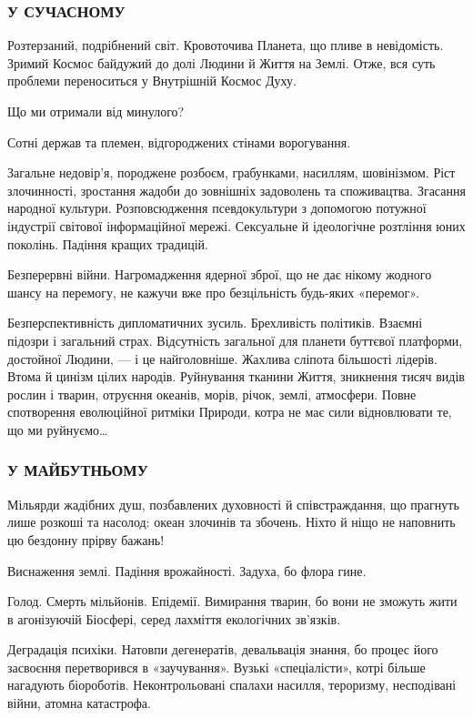 \subsubsection{У СУЧАСНОМУ}

Розтерзаний, подрібнений світ. Кровоточива Планета, що пливе в невідомість.
Зримий Космос байдужий до долі Людини й Життя на Землі. Отже, вся суть проблеми
переноситься у Внутрішній Космос Духу.

Що ми отримали від минулого?

Сотні держав та племен, відгороджених стінами ворогування.

Загальне недовір’я, породжене розбоєм, грабунками, насиллям, шовінізмом. Ріст
злочинності, зростання жадоби до зовнішніх задоволень та споживацтва. Згасання
народної культури. Розповсюдження псевдокультури з допомогою потужної індустрії
світової інформаційної мережі. Сексуальне й ідеологічне розтління юних
поколінь. Падіння кращих традицій.

Безперервні війни. Нагромадження ядерної зброї, що не дає нікому жодного шансу
на перемогу, не кажучи вже про безцільність будь-яких «перемог».

Безперспективність дипломатичних зусиль. Брехливість політиків. Взаємні підозри
і загальний страх. Відсутність загальної для планети буттєвої платформи,
достойної Людини, — і це найголовніше. Жахлива сліпота більшості лідерів. Втома
й цинізм цілих народів. Руйнування тканини Життя, зникнення тисяч видів рослин
і тварин, отруєння океанів, морів, річок, землі, атмосфери. Повне спотворення
еволюційної ритміки Природи, котра не має сили відновлювати те, що ми руйнуємо…

\subsubsection{У МАЙБУТНЬОМУ}

Мільярди жадібних душ, позбавлених духовності й співстраждання, що прагнуть
лише розкоші та насолод: океан злочинів та збочень. Ніхто й ніщо не наповнить
цю бездонну прірву бажань!

Виснаження землі. Падіння врожайності. Задуха, бо флора гине.

Голод. Смерть мільйонів. Епідемії. Вимирання тварин, бо вони не зможуть жити в
агонізуючій Біосфері, серед лахміття екологічних зв’язків.

Деградація психіки. Натовпи дегенератів, девальвація знання, бо процес його
засвоєння перетворився в «заучування». Вузькі «спеціалісти», котрі більше
нагадують біороботів. Неконтрольовані спалахи насилля, тероризму, несподівані
війни, атомна катастрофа.

